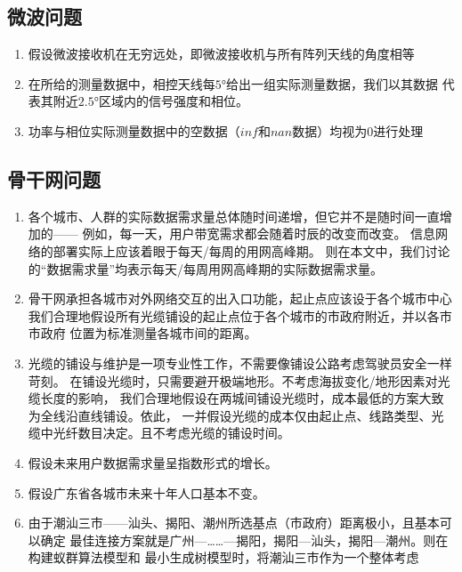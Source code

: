 \documentclass[UTF8,12pt]{ctexart}
\begin{document}
    \subsection{微波问题}
        \begin{enumerate}
            \item 假设微波接收机在无穷远处，即微波接收机与所有阵列天线的角度相等
            \item 在所给的测量数据中，相控天线每$5°$给出一组实际测量数据，我们以其数据
                代表其附近$2.5°$区域内的信号强度和相位。
            \item 功率与相位实际测量数据中的空数据（$inf$和$nan$数据）均视为0进行处理
        \end{enumerate}
    

    \subsection{骨干网问题}
        \begin{enumerate}
            \item 各个城市、人群的实际数据需求量总体随时间递增，但它并不是随时间一直增加的——
                例如，每一天，用户带宽需求都会随着时辰的改变而改变。
                信息网络的部署实际上应该着眼于每天/每周的用网高峰期。
                则在本文中，我们讨论的“数据需求量”均表示每天/每周用网高峰期的实际数据需求量。

            \item 骨干网承担各城市对外网络交互的出入口功能，起止点应该设于各个城市中心
                我们合理地假设所有光缆铺设的起止点位于各个城市的市政府附近，并以各市市政府
                位置为标准测量各城市间的距离。
            
            \item 光缆的铺设与维护是一项专业性工作，不需要像铺设公路考虑驾驶员安全一样苛刻。
                在铺设光缆时，只需要避开极端地形。不考虑海拔变化/地形因素对光缆长度的影响，
                我们合理地假设在两城间铺设光缆时，成本最低的方案大致为全线沿直线铺设。依此，
                一并假设光缆的成本仅由起止点、线路类型、光缆中光纤数目决定。且不考虑光缆的铺设时间。
            \item 假设未来用户数据需求量呈指数形式的增长。
            \item 假设广东省各城市未来十年人口基本不变。
            \item 由于潮汕三市——汕头、揭阳、潮州所选基点（市政府）距离极小，且基本可以确定
                最佳连接方案就是广州—……—揭阳，揭阳—汕头，揭阳—潮州。则在构建蚁群算法模型和
                最小生成树模型时，将潮汕三市作为一个整体考虑
        \end{enumerate}
\end{document}
